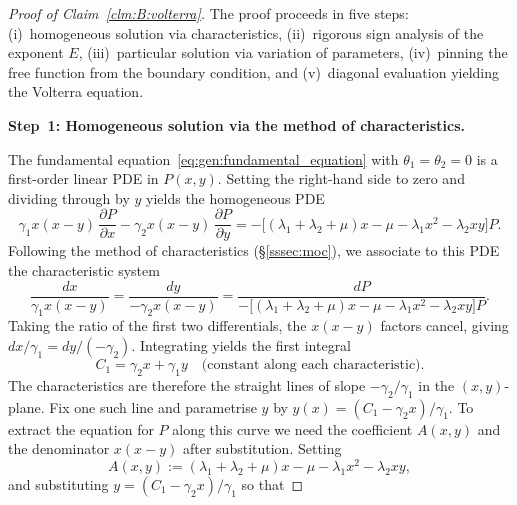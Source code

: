 \begin{proof}[Proof of Claim~\ref{clm:B:volterra}]
The proof proceeds in five steps: (i)~homogeneous solution via characteristics,
(ii)~rigorous sign analysis of the exponent $E$, (iii)~particular solution via
variation of parameters, (iv)~pinning the free function from the boundary condition,
and (v)~diagonal evaluation yielding the Volterra equation.

\medskip\noindent\textbf{Step~1: Homogeneous solution via the method of characteristics.}

The fundamental equation~\eqref{eq:gen:fundamental_equation} with
$\theta_1=\theta_2=0$ is a first-order linear PDE in $P(x,y)$. Setting the
right-hand side to zero and dividing through by $y$ yields the homogeneous PDE
\begin{equation}
    \gamma_1 x(x-y)\,\frac{\partial P}{\partial x}
    - \gamma_2 x(x-y)\,\frac{\partial P}{\partial y}
    = -\bigl[(\lambda_1+\lambda_2+\mu)x - \mu - \lambda_1 x^2
             - \lambda_2 xy\bigr]P.
    \label{eq:B:homogeneous_pde}
\end{equation}
Following the method of characteristics (\S\ref{sssec:moc}), we associate to
this PDE the characteristic system
\begin{equation}
    \frac{dx}{\gamma_1 x(x-y)}
    = \frac{dy}{-\gamma_2 x(x-y)}
    = \frac{dP}{-\bigl[(\lambda_1+\lambda_2+\mu)x - \mu
               - \lambda_1 x^2 - \lambda_2 xy\bigr]P}.
    \label{eq:B:char_system}
\end{equation}
Taking the ratio of the first two differentials, the $x(x-y)$ factors cancel,
giving $dx/\gamma_1 = dy/(-\gamma_2)$.  Integrating yields the first integral
\begin{equation}
    C_1 = \gamma_2 x + \gamma_1 y \quad\text{(constant along each characteristic)}.
    \label{eq:B:char_constant}
\end{equation}
The characteristics are therefore the straight lines of slope $-\gamma_2/\gamma_1$
in the $(x,y)$-plane. Fix one such line and parametrise $y$ by
$y(x) = (C_1-\gamma_2 x)/\gamma_1$.  To extract the equation for $P$ along this
curve we need the coefficient $A(x,y)$ and the denominator $x(x-y)$ after
substitution.  Setting
\begin{equation}
    A(x,y) := (\lambda_1+\lambda_2+\mu)x - \mu - \lambda_1 x^2 - \lambda_2 xy,
    \label{eq:B:Adef}
\end{equation}
and substituting $y = (C_1-\gamma_2 x)/\gamma_1$ so that

\end{proof}
